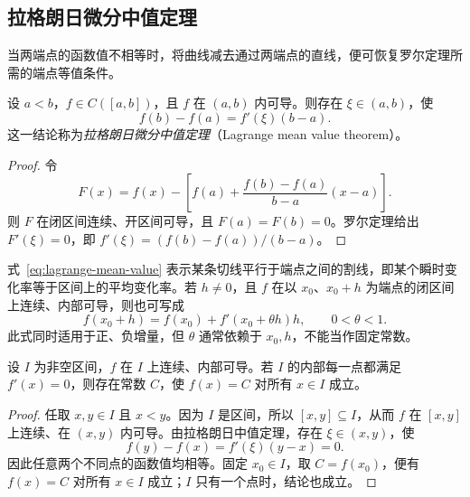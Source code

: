 \subsection{拉格朗日微分中值定理}
\label{subsec:lagrange-mean-value-theorem}

当两端点的函数值不相等时，将曲线减去通过两端点的直线，便可恢复罗尔定理所需的端点等值条件。

\begin{theorem}[拉格朗日微分中值定理]
\label{thm:lagrange-mean-value}
设 $a<b$，$f\in C([a,b])$，且 $f$ 在 $(a,b)$ 内可导。则存在 $\xi\in(a,b)$，使
\begin{equation}
    f(b)-f(a)=f'(\xi)(b-a).
    \label{eq:lagrange-mean-value}
\end{equation}
这一结论称为\emph{拉格朗日微分中值定理}（Lagrange mean value theorem）。
\end{theorem}

\begin{proof}
令
\[
    F(x)=f(x)-\left[f(a)+\frac{f(b)-f(a)}{b-a}(x-a)\right].
\]
则 $F$ 在闭区间连续、开区间可导，且 $F(a)=F(b)=0$。罗尔定理给出 $F'(\xi)=0$，即 $f'(\xi)=(f(b)-f(a))/(b-a)$。
\end{proof}

式~\eqref{eq:lagrange-mean-value} 表示某条切线平行于端点之间的割线，即某个瞬时变化率等于区间上的平均变化率。若 $h\neq0$，且 $f$ 在以 $x_0$、$x_0+h$ 为端点的闭区间上连续、内部可导，则也可写成
\begin{equation}
    f(x_0+h)=f(x_0)+f'(x_0+\theta h)h,
    \qquad 0<\theta<1.
    \label{eq:lagrange-increment-form}
\end{equation}
此式同时适用于正、负增量，但 $\theta$ 通常依赖于 $x_0,h$，不能当作固定常数。

\begin{corollary}[导数恒为零]
\label{cor:zero-derivative-constant}
设 $I$ 为非空区间，$f$ 在 $I$ 上连续、内部可导。若 $I$ 的内部每一点都满足 $f'(x)=0$，则存在常数 $C$，使 $f(x)=C$ 对所有 $x\in I$ 成立。
\end{corollary}

\begin{proof}
任取 $x,y\in I$ 且 $x<y$。因为 $I$ 是区间，所以 $[x,y]\subseteq I$，从而 $f$ 在 $[x,y]$ 上连续、在 $(x,y)$ 内可导。由拉格朗日中值定理，存在 $\xi\in(x,y)$，使
\[
    f(y)-f(x)=f'(\xi)(y-x)=0.
\]
因此任意两个不同点的函数值均相等。固定 $x_0\in I$，取 $C=f(x_0)$，便有 $f(x)=C$ 对所有 $x\in I$ 成立；$I$ 只有一个点时，结论也成立。
\end{proof}

